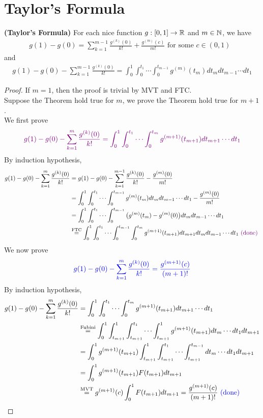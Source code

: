 \documentclass{report}
\begin{document}
\section{Taylor's Formula}
\begin{theorem}
\textbf{(Taylor's Formula)} For each nice function  $g:[0,1]\rightarrow \mathbb{R}$ and $m \in\mathbb{N}$, we have
\begin{align*}
g(1)-g(0)=\sum_{k=1}^{m-1} \frac{g^{(k)}(0)}{k!} + \frac{g^{(m)}(c)}{m!}\text{ for some $c \in (0,1)$ }
\end{align*}
and 
\begin{align*}
  g(1)-g(0)-\sum_{k=1}^{m-1} \frac{g^{(k)}(0)}{k!}= \int_0^1 \int_0^{t_1}\cdots \int_{0}^{t_{m-1}} g^{(m)}(t_{m})dt_{m}dt_{m-1}\cdots dt_1
\end{align*}
\end{theorem}
\begin{proof}
If $m=1$, then the proof is trivial by MVT and FTC.\\

Suppose the Theorem hold true for  $m$, we prove the Theorem hold true for $m+1$.\\

We first prove 
\begin{align*}
  \textcolor{violet}{g(1)-g(0)- \sum_{k=1}^{m} \frac{g^{(k)}(0)}{k!} =  \int_0^1 \int_0 ^{t_1}\cdots \int_0 ^{t_m} g^{(m+1)}(t_{m+1})dt_{m+1} \cdots dt_1} 
\end{align*}
By induction hypothesis, 
\begin{align*}
g(1)-g(0)-\sum_{k=1}^m \frac{g^{(k)}(0)}{k!}&= g(1)-g(0)-\sum_{k=1}^{m-1} \frac{g^{(k)}(0)}{k!}  - \frac{g^{(m)}(0)}{m!}\\
&=\int_0^{1}\int_0^{t_1}\cdots \int_0^{t_{m-1}}g^{(m)}(t_{m})dt_{m}dt_{m-1}\cdots dt_1 - \frac{g^{(m)}(0)}{m!} \\
&=\int_0^1 \int_0^{t_1} \cdots \int_0^{t_{m-1}}\big(g^{(m)}(t_m)- g^{(m)}(0) \big)dt_m dt_{m-1} \cdots dt_1\\
&\overset{\text{FTC}}{=}\int_0^1 \int_0^{t_1}\cdots \int_0^{t_{m-1}}\int_0^{t_m} g^{(m+1)}(t_{m+1})dt_{m+1}dt_mdt_{m-1} \cdots dt_1 \textcolor{violet}{\text{ (done) }}
\end{align*}
We now prove 
\begin{align*}
\textcolor{blue}{g(1)-g(0)- \sum_{k=1}^m \frac{g^{(k)}(0)}{k!}= \frac{g^{(m+1)}(c)}{(m+1)!}}
\end{align*}
By induction hypothesis, 
\begin{align*}
g(1)-g(0)-\sum_{k=1}^m \frac{g^{(k)}(0)}{k!} &= \int_0^1 \int_0^{t_1} \cdots \int_0^{t_m}g^{(m+1)}(t_{m+1})dt_{m+1}\cdots dt_1 \\
&\overset{\text{Fubini}}{=} \int_0^1 \int_{t_{m+1}}^1 \int^{t_1}_{t_{m+1}}\cdots \int^1_{t_{m+1}} g^{(m+1)}(t_{m+1})dt_m \cdots dt_1 dt_{m+1} \\
&=\int_0^1 g^{(m+1)}(t_{m+1}) \int^1_{t_{m+1}}\int^{t_1}_{t_{m+1}}\cdots \int^{t_{m-1}}_{t_{m+1}} dt_m\cdots dt_1 dt_{m+1} \\
&= \int_0^1 g^{(m+1)}(t_{m+1}) F(t_{m+1})dt_{m+1}\\
&\overset{\text{MVT}}{=}g^{(m+1)}(c) \int_0^1 F(t_{m+1})dt_{m+1}= \frac{g^{(m+1)}(c)}{(m+1)!} \textcolor{blue}{\text{ (done) }}
\end{align*}
\end{proof}
\end{document}
